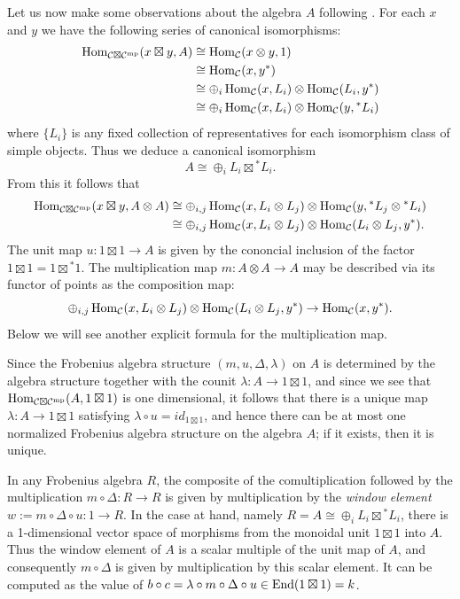 \documentclass{amsart}
\begin{document}
Let us now make some observations about the algebra $A$ following \cite{MR1966524, MR2097289}. For each $x$ and $y$ we have the following series of canonical isomorphisms:
\begin{align*}
	\operatorname{Hom}_{\mathcal C \boxtimes \mathcal C^{\mathrm{mp}}}( x \boxtimes y , A) & \cong \operatorname{Hom}_{\mathcal C}(x \otimes y, 1) \\
	 & \cong \operatorname{Hom}_{\mathcal C}(x, y^*) \\
	 & \cong \oplus_i \operatorname{Hom}_{\mathcal C}(x, L_i) \otimes \operatorname{Hom}_{\mathcal C}(L_i, y^*) \\
	 & \cong \oplus_i \operatorname{Hom}_{\mathcal C}(x, L_i) \otimes \operatorname{Hom}_{\mathcal C}(y, {}^*L_i)	 
\end{align*}
where $\{L_i\}$ is any fixed collection of representatives for each isomorphism class of simple objects. Thus we deduce a canonical isomorphism
\begin{equation*}
	A \cong \oplus_i L_i \boxtimes {}^*L_i.
\end{equation*}
From this it follows that 
\begin{align*}
	\operatorname{Hom}_{\mathcal C \boxtimes \mathcal C^{\mathrm{mp}}}( x \boxtimes y , A \otimes A) & \cong \oplus_{i,j} \operatorname{Hom}_{\mathcal C}(x, L_i \otimes L_j) \otimes \operatorname{Hom}_{\mathcal C}(y, {}^* L_j \otimes {}^*L_i) \\
	& \cong \oplus_{i,j} \operatorname{Hom}_{\mathcal C}(x, L_i \otimes L_j) \otimes \operatorname{Hom}_{\mathcal C}(L_i \otimes L_j, y^*).
\end{align*}
The unit map $u: 1 \boxtimes 1 \to A$ is given by the cononcial inclusion of the factor $1 \boxtimes 1 = 1 \boxtimes {}^*1$. The multiplication map $m: A \otimes A \to A$ may be described via its functor of points as the composition map:
\begin{equation*}
	\oplus_{i,j} \operatorname{Hom}_{\mathcal C}(x, L_i \otimes L_j) \otimes \operatorname{Hom}_{\mathcal C}(L_i \otimes L_j, y^*) \to \operatorname{Hom}_{\mathcal C}(x, y^*).
\end{equation*}
Below we will see another explicit formula for the multiplication map. 

Since the Frobenius algebra structure $(m,u, \Delta, \lambda)$ on $A$ is determined by the algebra structure together with the counit $\lambda: A \to 1 \boxtimes 1$, and since we see that $\operatorname{Hom}_{\mathcal C \boxtimes \mathcal C^{\mathrm{mp}}}(A, 1 \boxtimes 1)$ is one dimensional, it follows that there is a unique map $\lambda:A \to 1 \boxtimes 1$ satisfying $\lambda \circ u = id_{1 \boxtimes 1}$, and hence there can be at most one normalized Frobenius algebra structure on the algebra $A$; if it exists, then it is unique. 

In any Frobenius algebra $R$, the composite of the comultiplication followed by the multiplication $m \circ \Delta: R \to R$ is given by multiplication by the {\em window element} $w := m \circ \Delta \circ u: 1 \to R$. In the case at hand, namely $R = A \cong \oplus_i L_i \boxtimes {}^*L_i$, there is a 1-dimensional vector space of morphisms from the monoidal unit $1 \boxtimes 1$ into $A$. Thus the window element of $A$ is a scalar multiple of the unit map of $A$, and consequently $m \circ \Delta$ is given by multiplication by this scalar element. It can be computed as the value of $ b \circ c =  \lambda \circ m \circ \Delta \circ u \in \operatorname{End}(1 \boxtimes 1) = k$. 
\end{document}
